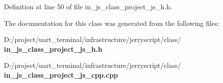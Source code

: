 Definition at line 50 of file in\+\_\+js\+\_\+class\+\_\+project\+\_\+js\+\_\+h.\+h.



The documentation for this class was generated from the following files\+:\begin{DoxyCompactItemize}
\item 
D\+:/project/uart\+\_\+terminal/infrastructure/jerryscript/class/\textbf{ in\+\_\+js\+\_\+class\+\_\+project\+\_\+js\+\_\+h.\+h}\item 
D\+:/project/uart\+\_\+terminal/infrastructure/jerryscript/class/\textbf{ in\+\_\+js\+\_\+class\+\_\+project\+\_\+js\+\_\+cpp.\+cpp}\end{DoxyCompactItemize}
